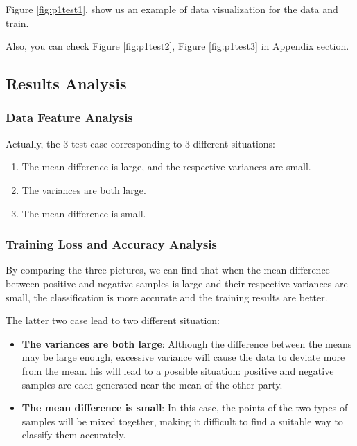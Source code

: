 Figure \ref{fig:p1test1},  show us an example of data visualization for the data and train.

Also, you can check Figure \ref{fig:p1test2}, Figure \ref{fig:p1test3} in Appendix section.

\subsection{Results Analysis}

\subsubsection{Data Feature Analysis}

Actually, the 3 test case corresponding to 3 different situations:

\begin{enumerate}
  \item The mean difference is large, and the respective variances are small.
  \item The variances are both large.
  \item The mean difference is small.
\end{enumerate}

\subsubsection{Training Loss and Accuracy Analysis}

By comparing the three pictures,
we can find that when the mean difference between positive and negative samples is large and their respective variances are small,
the classification is more accurate and the training results are better.

The latter two case lead to two different situation:

\begin{itemize}
  \item {\textbf{The variances are both large}:
      Although the difference between the means may be large enough,
      excessive variance will cause the data to deviate more from the mean.
      his will lead to a possible situation: positive and negative samples are each generated near the mean of the other party.
    }
  \item {\textbf{The mean difference is small}:
      In this case, the points of the two types of samples will be mixed together,
      making it difficult to find a suitable way to classify them accurately.
    }
\end{itemize}

